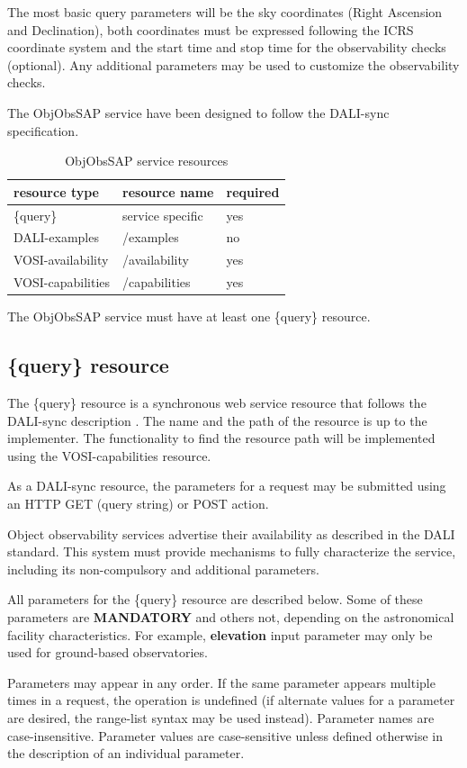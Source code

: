 \documentclass[11pt,a4paper]{ivoatex/ivoa}
\begin{document}
The most basic query parameters will be the sky coordinates (Right
Ascension and Declination), both coordinates must be expressed following
the ICRS coordinate system and the start time and stop time for the
observability checks (optional). Any additional parameters may be used to
customize the observability checks.

The ObjObsSAP service have been designed to follow the DALI-sync
specification.

\begin{table}[h]
\centering
\begin{tabular}{|l|l|l|}
\hline
\textbf{resource type} & \textbf{resource name} & \textbf{required
} \\
\hline
\{query\} & service specific & yes \\
\hline
DALI-examples & /examples & no \\
\hline
VOSI-availability & /availability & yes \\
\hline
VOSI-capabilities & /capabilities & yes \\
\hline
\end{tabular}
\caption{ObjObsSAP service resources}
\end{table}
The ObjObsSAP service must have at least one \{query\} resource.

\subsection{\{query\} resource} \label{sec:query}
The \{query\} resource is a synchronous web service resource that
follows the DALI-sync description . The name and the path of the
resource is up to the implementer. The functionality to find the
resource path will be implemented using the VOSI-capabilities
resource.

As a DALI-sync resource, the parameters for a request may be submitted
using an HTTP GET (query string) or POST action.

Object observability services advertise their availability as described in
the DALI standard. This system must provide mechanisms to fully
characterize the service, including its non-compulsory and additional
parameters.

All parameters for the \{query\} resource are described below. Some of
these parameters are \textbf{MANDATORY }and others not, depending on
the astronomical facility characteristics. For example, \textbf{
elevation} input parameter may only be used for ground-based
observatories.

Parameters may appear in any order. If the same parameter appears
multiple times in a request, the operation is undefined (if alternate
values for a parameter are desired, the range-list syntax may be used
instead). Parameter names are case-insensitive. Parameter values are
case-sensitive unless defined otherwise in the description of an
individual parameter.
\end{document}
